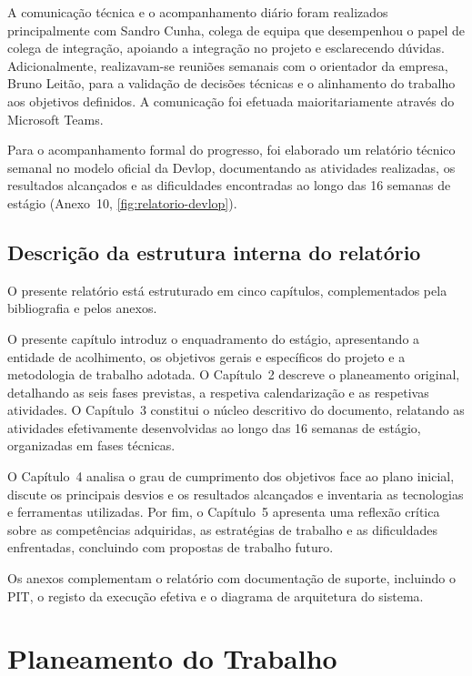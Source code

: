 \documentclass[a4paper,12pt]{report}
\begin{document}
A comunicação técnica e o acompanhamento diário foram realizados principalmente com Sandro Cunha, colega de equipa que desempenhou o papel de colega de integração, apoiando a integração no projeto e esclarecendo dúvidas. Adicionalmente, realizavam-se reuniões semanais com o orientador da empresa, Bruno Leitão, para a validação de decisões técnicas e o alinhamento do trabalho aos objetivos definidos. A comunicação foi efetuada maioritariamente através do Microsoft Teams.

Para o acompanhamento formal do progresso, foi elaborado um relatório técnico semanal no modelo oficial da Devlop, documentando as atividades realizadas, os resultados alcançados e as dificuldades encontradas ao longo das 16 semanas de estágio (Anexo~10, \autoref{fig:relatorio-devlop}).

\section{Descrição da estrutura interna do relatório}

O presente relatório está estruturado em cinco capítulos, complementados pela bibliografia e pelos anexos.

O presente capítulo introduz o enquadramento do estágio, apresentando a entidade de acolhimento, os objetivos gerais e específicos do projeto e a metodologia de trabalho adotada. O Capítulo~2 descreve o planeamento original, detalhando as seis fases previstas, a respetiva calendarização e as respetivas atividades. O Capítulo~3 constitui o núcleo descritivo do documento, relatando as atividades efetivamente desenvolvidas ao longo das 16 semanas de estágio, organizadas em fases técnicas.

O Capítulo~4 analisa o grau de cumprimento dos objetivos face ao plano inicial, discute os principais desvios e os resultados alcançados e inventaria as tecnologias e ferramentas utilizadas. Por fim, o Capítulo~5 apresenta uma reflexão crítica sobre as competências adquiridas, as estratégias de trabalho e as dificuldades enfrentadas, concluindo com propostas de trabalho futuro.

Os anexos complementam o relatório com documentação de suporte, incluindo o PIT, o registo da execução efetiva e o diagrama de arquitetura do sistema.

\chapter{Planeamento do Trabalho}
\end{document}
